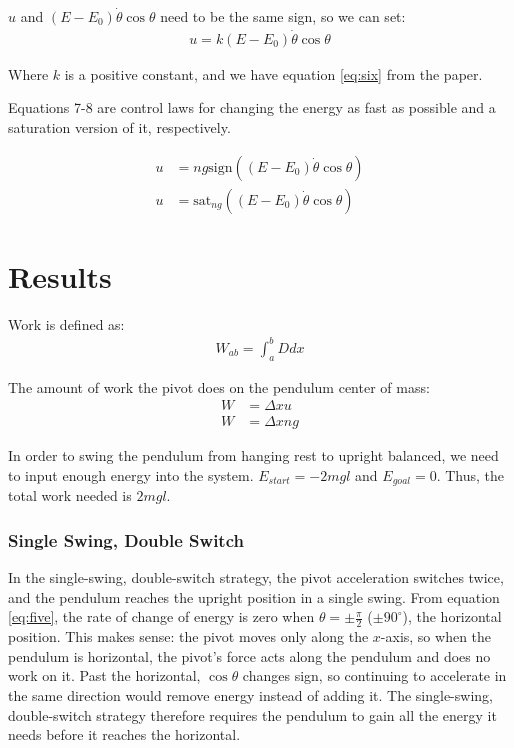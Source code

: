 \documentclass{article}
\begin{document}
$u$ and $(E-E_0)\dot{\theta}\cos{\theta}$ need to be the same sign, so we can set:
\begin{align}
    u = k(E-E_0)\dot{\theta}\cos{\theta} \label{eq:six}
\end{align}

Where $k$ is a positive constant, and we have equation \eqref{eq:six} from the paper.

Equations 7-8 are control laws for changing the energy as fast as possible and a saturation version of it, respectively.

\begin{align}
    u &= ng \text{sign}\left((E-E_0)\dot{\theta}\cos{\theta} \right) \label{eq:seven} \\
    u &= \text{sat}_{ng}\left((E-E_0)\dot{\theta}\cos{\theta} \right) \label{eq:eight}
\end{align}

\section{Results}

Work is defined as:
\begin{align}
    W_{ab} = \int_a^b{D dx} \label{eq:nine}
\end{align}

The amount of work the pivot does on the pendulum center of mass:
\begin{align*}
    W &= \Delta x u \\
    W &=\Delta x ng
\end{align*}

In order to swing the pendulum from hanging rest to upright balanced, we need to input enough energy into the system. $E_{start} = -2mgl$ and $E_{goal} = 0$. Thus, the total work needed is $2mgl$.

\subsubsection{Single Swing, Double Switch}
In the single-swing, double-switch strategy, the pivot acceleration switches twice, and the pendulum reaches the upright position in a single swing. From equation \eqref{eq:five}, the rate of change of energy is zero when $\theta = \pm \frac{\pi}{2}$ ($\pm 90^\circ$), the horizontal position. This makes sense: the pivot moves only along the $x$-axis, so when the pendulum is horizontal, the pivot's force acts along the pendulum and does no work on it. Past the horizontal, $\cos\theta$ changes sign, so continuing to accelerate in the same direction would remove energy instead of adding it. The single-swing, double-switch strategy therefore requires the pendulum to gain all the energy it needs before it reaches the horizontal.
\end{document}
